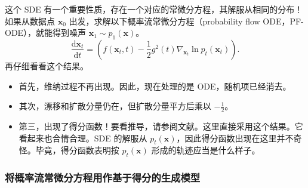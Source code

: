 这个 SDE 有一个重要性质，存在一个对应的常微分方程，其解服从相同的分布！如果从数据点 $\mathbf x_0$ 出发，求解以下概率流常微分方程（probability flow ODE，PF-ODE），就能得到噪声 $\mathbf x_1\sim p_1(\mathbf x)$。
\begin{equation}
  \frac{\mathrm d\mathbf x_t}{\mathrm dt}
  =\left(f(\mathbf x_t,t)-\frac12g^2(t)\nabla_{\mathbf x_t}\ln p_t(\mathbf x_t)\right).
  \tag{9.26}\label{eq:09-26}
\end{equation}
再仔细看看这个结果。
\begin{itemize}
  \item 首先，维纳过程不再出现。因此，现在处理的是 ODE，随机项已经消去。
  \item 其次，漂移和扩散分量仍在，但扩散分量平方后乘以 $-\frac12$。
  \item 第三，出现了得分函数！要看推导，请参阅文献。这里直接采用这个结果。它看起来也合情合理。SDE 的解服从 $p_t(\mathbf x)$，因此得分函数出现在这里并不奇怪。毕竟，得分函数表明按 $p_t(\mathbf x)$ 形成的轨迹应当是什么样子。
\end{itemize}

\subsubsection{将概率流常微分方程用作基于得分的生成模型}

